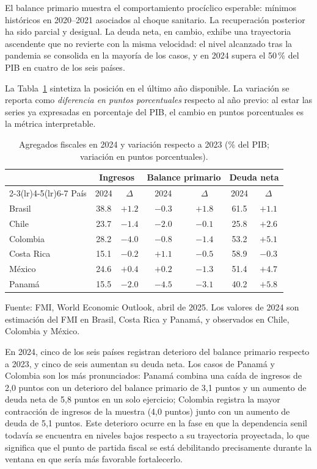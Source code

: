 \documentclass[12pt, letterpaper]{article}
\begin{document}
El balance primario muestra el comportamiento procíclico esperable: mínimos históricos en 2020--2021 asociados al choque sanitario. La recuperación
posterior ha sido parcial y desigual. La deuda neta, en cambio, exhibe una trayectoria
ascendente que no revierte con la misma velocidad: el nivel alcanzado tras la pandemia
se consolida en la mayoría de los casos, y en 2024 supera el 50\,\% del PIB en cuatro de
los seis países.

La Tabla~\ref{tab:ultimo-weo} sintetiza la posición en el último año disponible. La variación se reporta como \emph{diferencia en puntos porcentuales} respecto al año previo: al estar las series ya expresadas en porcentaje del PIB, el cambio en puntos porcentuales es la métrica interpretable.

\begin{table}[htbp]
  \centering
  \caption{Agregados fiscales en 2024 y variación respecto a 2023
  (\% del PIB; variación en puntos porcentuales).}
  \label{tab:ultimo-weo}
  \begin{tabular}{lcccccc}
    \toprule
    & \multicolumn{2}{c}{Ingresos} & \multicolumn{2}{c}{Balance primario}
    & \multicolumn{2}{c}{Deuda neta} \\
    \cmidrule(lr){2-3}\cmidrule(lr){4-5}\cmidrule(lr){6-7}
    País & 2024 & $\Delta$ & 2024 & $\Delta$ & 2024 & $\Delta$ \\
    \midrule
    Brasil     & 38.8 & $+1.2$ & $-0.3$ & $+1.8$ & 61.5 & $+1.1$ \\
    Chile      & 23.7 & $-1.4$ & $-2.0$ & $-0.1$ & 25.8 & $+2.6$ \\
    Colombia   & 28.2 & $-4.0$ & $-0.8$ & $-1.4$ & 53.2 & $+5.1$ \\
    Costa Rica & 15.1 & $-0.2$ & $+1.1$ & $-0.5$ & 58.9 & $-0.3$ \\
    México     & 24.6 & $+0.4$ & $+0.2$ & $-1.3$ & 51.4 & $+4.7$ \\
    Panamá     & 15.5 & $-2.0$ & $-4.5$ & $-3.1$ & 40.2 & $+5.8$ \\
    \bottomrule
  \end{tabular}

  \vspace{2pt}
  \footnotesize
  Fuente: FMI, World Economic Outlook, abril de 2025. Los valores de 2024 son
  estimación del FMI en Brasil, Costa Rica y Panamá, y observados en Chile, Colombia
  y México.
\end{table}

En 2024, cinco de los seis países registran deterioro del
balance primario respecto a 2023, y cinco de seis aumentan su deuda neta. Los casos de
Panamá y Colombia son los más pronunciados: Panamá combina una caída de ingresos de 2,0 puntos con un deterioro del balance primario de 3,1 puntos y un aumento de deuda neta de 5,8 puntos en un solo ejercicio; Colombia registra la mayor contracción de
ingresos de la muestra (4,0 puntos) junto con un aumento de deuda de 5,1 puntos. Este deterioro ocurre en la fase en que la dependencia senil todavía se encuentra en niveles bajos respecto a su trayectoria proyectada, lo que significa que el punto de partida
fiscal se está debilitando precisamente durante la ventana en que sería más favorable fortalecerlo.
\end{document}
